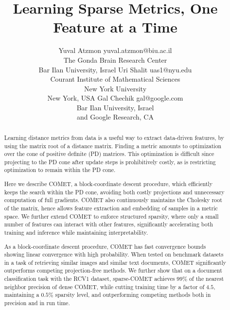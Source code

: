 \documentclass[twoside,11pt]{article}
\begin{document}
\title{Learning Sparse Metrics, One Feature at a Time}


\author{\name Yuval Atzmon \email yuval.atzmon@biu.ac.il \\
       \addr The Gonda Brain Research Center\\
       Bar Ilan University, Israel
       \AND
       \name Uri Shalit \email uas1@nyu.edu \\
       \addr Courant Institute of Mathematical Sciences \\
       New York University\\
       New York, USA
       \AND
      \name Gal Chechik \email gal@google.com \\
       \addr Bar Ilan University, Israel\\
       and Google Research, CA}
\editor{ }

\maketitle

\begin{abstract}%

Learning distance metrics from data is a useful way to extract data-driven features, by using the matrix root of a distance matrix. Finding a metric amounts to optimization over the cone of positive definite (PD) matrices. This optimization is difficult since projecting to the PD cone after update steps is prohibitively costly, as is restricting optimization to remain within the PD cone.

Here we describe COMET, a block-coordinate descent procedure, which efficiently keeps the search within the PD cone, avoiding both costly projections and unnecessary computation of full gradients. COMET also continuously maintains the Cholesky root of the matrix, hence allows feature extraction and embedding of samples in a metric space. We further extend COMET to enforce structured sparsity, where only a small number of features can interact with other features, significantly accelerating both training and inference while maintaining interpretability. 
 
As a block-coordinate descent procedure, COMET has fast convergence bounds showing linear convergence with high probability. When tested on benchmark datasets in a task of retrieving similar images and similar text documents, COMET significantly outperforms competing projection-free methods. We further show that on a document classification task with the RCV1 dataset, sparse-COMET achieves $99\%$ of the nearest neighbor precision of dense COMET, while cutting training time by a factor of $4.5$, maintaining a $0.5\%$ sparsity level, and outperforming competing methods both in precision and in run time. 
\end{abstract}
\end{document}
